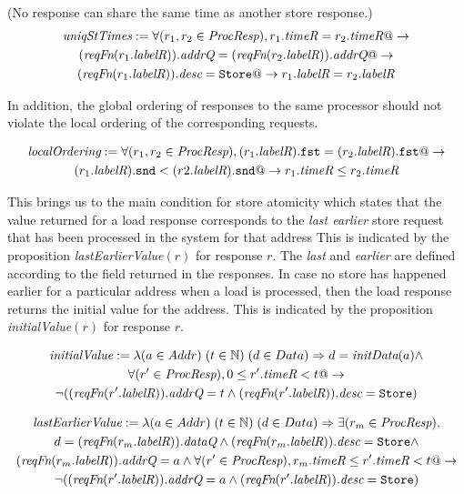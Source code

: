 \begin{defn} (No response can share the same time as another store response.)
\small
\begin{multline*}
\textit{uniqStTimes} := 
\forall (r_1, r_2 \in \textit{ProcResp}),
r_1.\textit{timeR} = r_2.\textit{timeR} @-> \\
(\textit{reqFn} (r_1.\textit{labelR})).\textit{addrQ} = (\textit{reqFn} (r_2.\textit{labelR})).\textit{addrQ} @->\\
(\textit{reqFn} (r_1.\textit{labelR})).\textit{desc} = \texttt{Store} @->
r_1.\textit{labelR} = r_2.\textit{labelR}
\end{multline*}
\end{defn}

In addition, the global ordering of responses to the same processor should not
violate the local ordering of the corresponding requests.

\begin{defn}
\small
\begin{multline*}
\textit{localOrdering} :=
\forall (r_1, r_2 \in \textit{ProcResp}), (r_1.\textit{labelR}).\texttt{fst} = (r_2.\textit{labelR}).\texttt{fst} @->\\
(r_1.\textit{labelR}).\texttt{snd} < (r2.\textit{labelR}).\texttt{snd} @-> r_1.\textit{timeR} \le r_2.\textit{timeR}
\end{multline*}
\end{defn}

This brings us to the main condition for store atomicity which states that the
value returned for a load response corresponds to the \emph{last earlier} store
request that has been processed in the system for that address This is
indicated by the proposition \textit{lastEarlierValue}$(r)$ for response $r$.
The \emph{last} and \emph{earlier} are defined according to the field \timeR{}
returned in the responses. In case no store has happened earlier for a
particular address when a load is processed, then the load response returns the
initial value for the address. This is indicated by the proposition
\textit{initialValue}$(r)$ for response $r$.
\begin{defn}
\small
\begin{multline*}
\textit{initialValue} := \lambda (a \in Addr)\; (t \in \mathbb{N}) \; (d \in Data)\Rightarrow
d = \textit{initData} (a) \wedge \\
\forall (r' \in \textit{ProcResp}), 0 \le r'.\textit{timeR} < t @->\\
\neg ((\textit{reqFn} (r'.\textit{labelR})).\textit{addrQ} = t \wedge (\textit{reqFn} (r'.\textit{labelR})).\textit{desc} = \texttt{Store})
\end{multline*}
\end{defn}

\begin{defn}
\small
\begin{multline*}
\textit{lastEarlierValue} := \lambda (a \in Addr)\; (t \in \mathbb{N}) \; (d \in Data)\Rightarrow
\exists (r_m \in \textit{ProcResp}),\\ d = (\textit{reqFn} (r_m.\textit{labelR})).\textit{dataQ} \wedge 
(\textit{reqFn} (r_m.\textit{labelR})).\textit{desc} = \texttt{Store} \wedge\\ (\textit{reqFn} (r_m.\textit{labelR})).\textit{addrQ} = a \wedge
\forall (r' \in \textit{ProcResp}), r_m.\textit{timeR} \le r'.\textit{timeR} < t @->\\
\neg ((\textit{reqFn} (r'.\textit{labelR})).\textit{addrQ} = a \wedge (\textit{reqFn} (r'.\textit{labelR})).\textit{desc} = \texttt{Store})
\end{multline*}
\end{defn}

